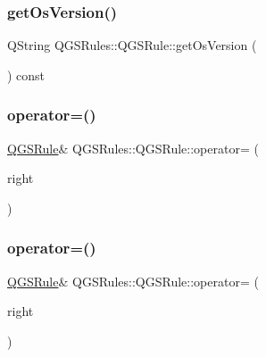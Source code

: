 \subsubsection{\texorpdfstring{get\+Os\+Version()}{getOsVersion()}}
{\footnotesize\ttfamily Q\+String Q\+G\+S\+Rules\+::\+Q\+G\+S\+Rule\+::get\+Os\+Version (\begin{DoxyParamCaption}{ }\end{DoxyParamCaption}) const}

\mbox{\label{class_q_g_s_rules_1_1_q_g_s_rule_aeaa8fecf6317667b4cd8de00f4aa9f0b}} 
\subsubsection{\texorpdfstring{operator=()}{operator=()}\hspace{0.1cm}{\footnotesize\ttfamily [1/2]}}
{\footnotesize\ttfamily \mbox{\hyperlink{class_q_g_s_rules_1_1_q_g_s_rule}{Q\+G\+S\+Rule}}\& Q\+G\+S\+Rules\+::\+Q\+G\+S\+Rule\+::operator= (\begin{DoxyParamCaption}\item[{const \mbox{\hyperlink{class_q_g_s_rules_1_1_q_g_s_rule}{Q\+G\+S\+Rule}} \&}]{right }\end{DoxyParamCaption})\hspace{0.3cm}{\ttfamily [default]}}

\mbox{\label{class_q_g_s_rules_1_1_q_g_s_rule_a8b21435bf4144abe169f068d423f561c}} 
\subsubsection{\texorpdfstring{operator=()}{operator=()}\hspace{0.1cm}{\footnotesize\ttfamily [2/2]}}
{\footnotesize\ttfamily \mbox{\hyperlink{class_q_g_s_rules_1_1_q_g_s_rule}{Q\+G\+S\+Rule}}\& Q\+G\+S\+Rules\+::\+Q\+G\+S\+Rule\+::operator= (\begin{DoxyParamCaption}\item[{\mbox{\hyperlink{class_q_g_s_rules_1_1_q_g_s_rule}{Q\+G\+S\+Rule}} \&\&}]{right }\end{DoxyParamCaption})\hspace{0.3cm}{\ttfamily [default]}}

